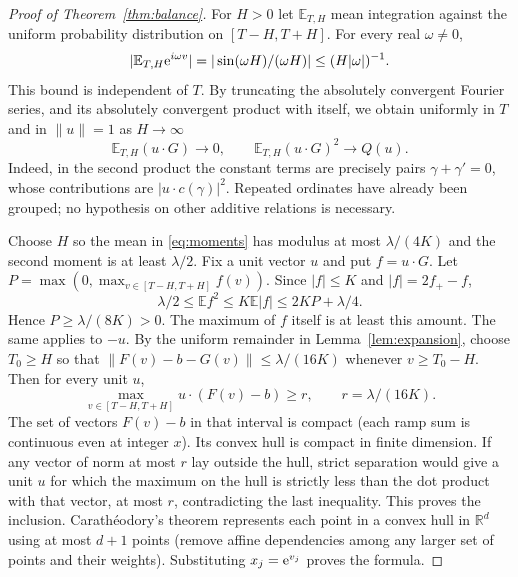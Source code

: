 \documentclass[11pt]{article}
\theoremstyle{remark}\newtheorem{remark}[theorem]{Remark}
\newcommand{\R}{\mathbb R}\newcommand{\C}{\mathbb C}\newcommand{\Z}{\mathbb Z}
\begin{document}
\begin{proof}[Proof of Theorem~\ref{thm:balance}]
For $H>0$ let $\mathbb E_{T,H}$ mean integration against the uniform probability distribution on $[T-H,T+H]$. For every real $\omega\ne0$,
\[
 |\mathbb E_{T,H}\mathrm e^{i\omega v}|=|\sin(\omega H)/(\omega H)|\le (H|\omega|)^{-1}.
\]
This bound is independent of $T$. By truncating the absolutely convergent Fourier series, and its absolutely convergent product with itself, we obtain uniformly in $T$ and in $\|u\|=1$ as $H\to\infty$
\begin{equation}\label{eq:moments}
 \mathbb E_{T,H}(u\cdot G)\longrightarrow 0,\qquad
 \mathbb E_{T,H}(u\cdot G)^2\longrightarrow Q(u).
\end{equation}
Indeed, in the second product the constant terms are precisely pairs $\gamma+\gamma'=0$, whose contributions are $|u\cdot c(\gamma)|^2$. Repeated ordinates have already been grouped; no hypothesis on other additive relations is necessary.

Choose $H$ so the mean in \eqref{eq:moments} has modulus at most $\lambda/(4K)$ and the second moment is at least $\lambda/2$. Fix a unit vector $u$ and put $f=u\cdot G$. Let $P=\max(0,\max_{v\in[T-H,T+H]}f(v))$. Since $|f|\le K$ and $|f|=2f_+-f$,
\[
 \lambda/2\le\mathbb E f^2\le K\mathbb E|f|
             \le 2KP+\lambda/4.
\]
Hence $P\ge\lambda/(8K)>0$. The maximum of $f$ itself is at least this amount. The same applies to $-u$. By the uniform remainder in Lemma~\ref{lem:expansion}, choose $T_0\ge H$ so that $\|F(v)-b-G(v)\|\le\lambda/(16K)$ whenever $v\ge T_0-H$. Then for every unit $u$,
\[
 \max_{v\in[T-H,T+H]}u\cdot(F(v)-b)\ge r,\qquad r=\lambda/(16K).
\]
The set of vectors $F(v)-b$ in that interval is compact (each ramp sum is continuous even at integer $x$). Its convex hull is compact in finite dimension. If any vector of norm at most $r$ lay outside the hull, strict separation would give a unit $u$ for which the maximum on the hull is strictly less than the dot product with that vector, at most $r$, contradicting the last inequality. This proves the inclusion. Carath\'eodory's theorem represents each point in a convex hull in $\R^d$ using at most $d+1$ points (remove affine dependencies among any larger set of points and their weights). Substituting $x_j=\mathrm e^{v_j}$ proves the formula.
\end{proof}
\end{document}
